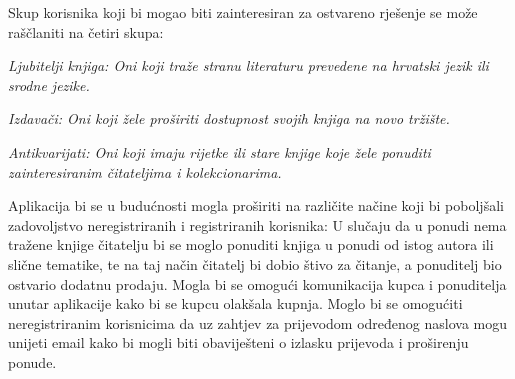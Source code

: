         Skup korisnika koji bi mogao biti zainteresiran za ostvareno rješenje se može raščlaniti na četiri skupa:
        \begin{packed_item}
			\item \textit{Ljubitelji knjiga: Oni koji traže stranu literaturu prevedene na hrvatski jezik ili srodne jezike.}
			\item \textit{Izdavači: Oni koji žele proširiti dostupnost svojih knjiga na novo tržište.}
			\item \textit{Antikvarijati: Oni koji imaju rijetke ili stare knjige koje žele ponuditi zainteresiranim čitateljima i kolekcionarima.}
		\end{packed_item}
        Aplikacija bi se u budućnosti mogla proširiti na različite načine koji bi poboljšali zadovoljstvo neregistriranih i registriranih korisnika:
        U slučaju da u ponudi nema tražene knjige čitatelju bi se moglo ponuditi knjiga u ponudi od istog autora ili slične tematike, te na taj način čitatelj bi dobio štivo za čitanje, a ponuditelj bio ostvario dodatnu prodaju. 
        Mogla bi se omogući komunikacija kupca i ponuditelja unutar aplikacije kako bi se kupcu olakšala kupnja.
        Moglo bi se omogućiti neregistriranim korisnicima da uz zahtjev za prijevodom određenog naslova mogu unijeti email kako bi mogli biti obaviješteni o izlasku prijevoda i proširenju ponude.
